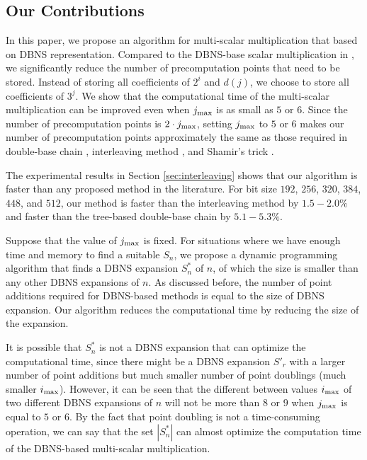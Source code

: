 \subsection{Our Contributions}

In this paper, we propose an algorithm for multi-scalar multiplication that based on DBNS representation.
Compared to the DBNS-base scalar multiplication in \cite{dbns},
we significantly reduce the number of precomputation points that need to be stored.
Instead of storing all coefficients of $2^i$ and $d(j)$, we choose to store all coefficients of $3^j$.
We show that the computational time of the multi-scalar multiplication can be improved even when $j_{\rm max}$ is as small as $5$ or $6$.
Since the number of precomputation points is $2 \cdot j_{\rm max}$,
setting $j_{\rm max}$ to $5$ or $6$ makes our number of precomputation points approximately the same as those required in
double-base chain \cite{experiment,dbc1}, interleaving method \cite{interleaving}, and Shamir's trick \cite{enlarged4}.

The experimental results in Section \ref{sec:interleaving} shows that our algorithm is faster than any proposed method in the literature.
For bit size $192$, $256$, $320$, $384$, $448$, and $512$,
our method is faster than the interleaving method by $1.5 - 2.0\%$
and faster than the tree-based double-base chain by $5.1 - 5.3\%$.

Suppose that the value of $j_{\rm max}$ is fixed.
For situations where we have enough time and memory to find a suitable $S_n$,
we propose a dynamic programming algorithm that finds a DBNS expansion $S^*_n$ of $n$, of which the size is smaller than any other DBNS expansions of $n$.
As discussed before, the number of point additions required for DBNS-based methods is equal to the size of DBNS expansion.
Our algorithm reduces the computational time by reducing the size of the expansion.

It is possible that $S^*_n$ is not a DBNS expansion that can optimize the computational time,
since there might be a DBNS expansion $S'_r$ with a larger number of point additions but much smaller number of point doublings (much smaller $i_{\rm max}$).
However, it can be seen that the different between values $i_{\rm max}$ of two different DBNS expansions of $n$
will not be more than $8$ or $9$ when $j_{\rm max}$ is equal to $5$ or $6$.
By the fact that point doubling is not a time-consuming operation,
we can say that the set $|S^*_n|$ can almost optimize the computation time of the DBNS-based multi-scalar multiplication.

